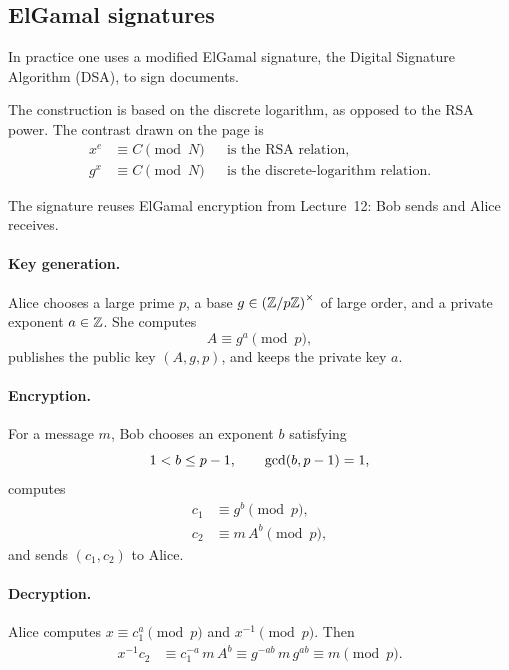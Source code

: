 \subsection{ElGamal signatures}

In practice one uses a modified ElGamal signature, the Digital Signature
Algorithm (DSA), to sign documents.

The construction is based on the discrete logarithm, as opposed to the
RSA power. The contrast drawn on the page is
\begin{align*}
    x^{e}&\equiv C\pmod{N}
        &&\text{is the RSA relation},\\
    g^{x}&\equiv C\pmod{N}
        &&\text{is the discrete-logarithm relation}.
\end{align*}


The signature reuses ElGamal encryption from Lecture~12: Bob sends and Alice receives.

\paragraph{Key generation.}
Alice chooses a large prime $p$, a base $g\in\left(\mathbb Z/p\mathbb Z\right)^\times$ of large order, and a private exponent $a\in\mathbb Z$. She computes
\[
    A\equiv g^{a}\pmod{p},
\]
publishes the public key $(A,g,p)$, and keeps the private key $a$.

\paragraph{Encryption.}
For a message $m$, Bob chooses an exponent $b$ satisfying
\[
    1<b\le p-1,
    \qquad
    \operatorname{gcd}(b,p-1)=1,
\]
computes
\begin{align*}
    c_{1}&\equiv g^{b}\pmod{p},\\
    c_{2}&\equiv m\,A^{b}\pmod{p},
\end{align*}
and sends $(c_{1},c_{2})$ to Alice.

\paragraph{Decryption.}
Alice computes $x\equiv c_{1}^{a}\pmod{p}$ and $x^{-1}\pmod{p}$. Then
\begin{align*}
    x^{-1}c_{2}
    &\equiv c_{1}^{-a}\,m\,A^{b}
     \equiv g^{-ab}\,m\,g^{ab}
     \equiv m\pmod{p}.
\end{align*}

